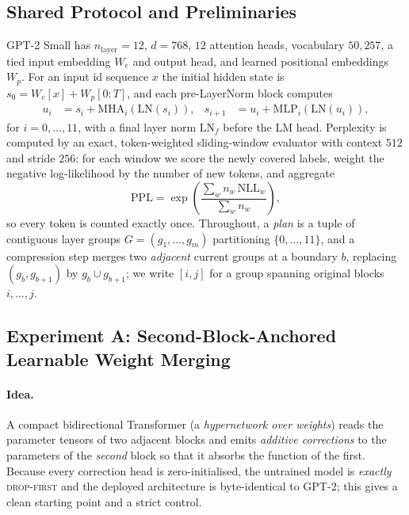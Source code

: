 \documentclass[10pt,a4paper]{article}
\newcommand{\dropfirst}{\textsc{drop-first}}
\begin{document}
\subsection{Shared Protocol and Preliminaries}
\label{sec:protocol}

GPT-2 Small has $n_\text{layer}=12$, $d=768$, $12$ attention heads, vocabulary
$50{,}257$, a tied input embedding $W_e$ and output head, and learned positional
embeddings $W_p$. For an input id sequence $x$ the initial hidden state is
$s_0 = W_e[x] + W_p[0{:}T]$, and each pre-LayerNorm block computes
\begin{align}
u_i &= s_i + \mathrm{MHA}_i(\mathrm{LN}(s_i)), &
s_{i+1} &= u_i + \mathrm{MLP}_i(\mathrm{LN}(u_i)),
\end{align}
for $i=0,\dots,11$, with a final layer norm $\mathrm{LN}_f$ before the LM head.
Perplexity is computed by an exact, token-weighted sliding-window evaluator with
context $512$ and stride $256$: for each window we score the newly covered
labels, weight the negative log-likelihood by the number of new tokens, and
aggregate
\begin{equation}
\mathrm{PPL} = \exp\!\left(\frac{\sum_w n_w\,\mathrm{NLL}_w}{\sum_w n_w}\right),
\end{equation}
so every token is counted exactly once. Throughout, a \emph{plan} is a tuple of
contiguous layer groups $G=(g_1,\dots,g_m)$ partitioning $\{0,\dots,11\}$, and a
compression step merges two \emph{adjacent} current groups at a boundary $b$,
replacing $(g_b,g_{b+1})$ by $g_b\cup g_{b+1}$; we write $[i,j]$ for a group
spanning original blocks $i,\dots,j$.

\subsection{Experiment A: Second-Block-Anchored Learnable Weight Merging}
\label{sec:expA}

\paragraph{Idea.} A compact bidirectional Transformer (a \emph{hypernetwork over
weights}) reads the parameter tensors of two adjacent blocks and emits
\emph{additive corrections} to the parameters of the \emph{second} block so that
it absorbs the function of the first. Because every correction head is
zero-initialised, the untrained model is \emph{exactly} \dropfirst{} and the
deployed architecture is byte-identical to GPT-2; this gives a clean starting
point and a strict control.
\end{document}

